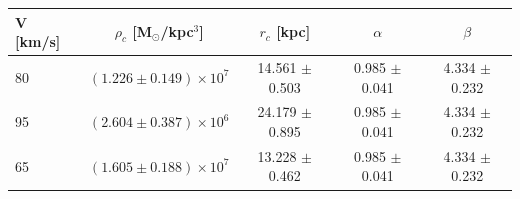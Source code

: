 \begin{tabular}{lcccc}
\toprule
V [km/s] & $\rho_c$ [M$_\odot$/kpc$^3$] & $r_c$ [kpc] & $\alpha$ & $\beta$ \\
\midrule
80 & $(1.226 \pm 0.149)\times10^{7}$ & 14.561 $\pm$ 0.503 & 0.985 $\pm$ 0.041 & 4.334 $\pm$ 0.232 \\
95 & $(2.604 \pm 0.387)\times10^{6}$ & 24.179 $\pm$ 0.895 & 0.985 $\pm$ 0.041 & 4.334 $\pm$ 0.232 \\
65 & $(1.605 \pm 0.188)\times10^{7}$ & 13.228 $\pm$ 0.462 & 0.985 $\pm$ 0.041 & 4.334 $\pm$ 0.232 \\
\bottomrule
\end{tabular}

